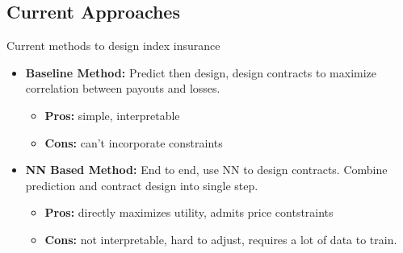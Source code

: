 \documentclass{beamer}
\begin{document}
\subsection{Current Approaches}
\begin{frame}{Current methods to design index insurance}
\begin{itemize}
    \setlength\itemsep{1em}
    \item \textbf{Baseline Method:} Predict then design, design contracts to maximize correlation between payouts and losses. \cite{chantarat2013designing}
    \begin{itemize}
        \item \textbf{Pros:} simple, interpretable
        \item \textbf{Cons:} can't incorporate constraints
    \end{itemize}
    \item \textbf{NN Based Method:} End to end, use NN to design contracts. Combine prediction and contract design into single step. \cite{chen2023managing}
    \begin{itemize}
        \item \textbf{Pros:} directly maximizes utility, admits price contstraints
        \item \textbf{Cons:} not interpretable, hard to adjust, requires a lot of data to train. 
    \end{itemize}
\end{itemize}
\end{frame} 

\end{document}
